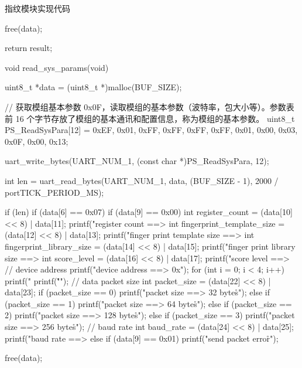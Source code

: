 \documentclass[lang=cn,newtx,10pt,scheme=chinese]{elegantbook}
\begin{document}
\begin{mycode}{指纹模块实现代码}
{    free(data);

    return result;
}

void read_sys_params(void)
{
    uint8_t *data = (uint8_t *)malloc(BUF_SIZE);

    // 获取模组基本参数 0x0F，读取模组的基本参数（波特率，包大小等）。参数表前 16 个字节存放了模组的基本通讯和配置信息，称为模组的基本参数。
    uint8_t PS_ReadSysPara[12] = {0xEF, 0x01, 0xFF, 0xFF, 0xFF, 0xFF, 0x01, 0x00, 0x03, 0x0F, 0x00, 0x13};

    uart_write_bytes(UART_NUM_1, (const char *)PS_ReadSysPara, 12);

    int len = uart_read_bytes(UART_NUM_1, data, (BUF_SIZE - 1), 2000 / portTICK_PERIOD_MS);

    if (len)
    {
        if (data[6] == 0x07)
        {
            if (data[9] == 0x00)
            {
                int register_count = (data[10] << 8) | data[11];
                printf("register count ==> %
                int fingerprint_template_size = (data[12] << 8) | data[13];
                printf("finger print template size ==> %
                int fingerprint_library_size = (data[14] << 8) | data[15];
                printf("finger print library size ==> %
                int score_level = (data[16] << 8) | data[17];
                printf("score level ==> %
                // device address
                printf("device address ==> 0x");
                for (int i = 0; i < 4; i++)
                {
                    printf("%
                }
                printf("\r\n");
                // data packet size
                int packet_size = (data[22] << 8) | data[23];
                if (packet_size == 0)
                {
                    printf("packet size ==> 32 bytes\r\n");
                }
                else if (packet_size == 1)
                {
                    printf("packet size ==> 64 bytes\r\n");
                }
                else if (packet_size == 2)
                {
                    printf("packet size ==> 128 bytes\r\n");
                }
                else if (packet_size == 3)
                {
                    printf("packet size ==> 256 bytes\r\n");
                }
                // baud rate
                int baud_rate = (data[24] << 8) | data[25];
                printf("baud rate ==> %
            }
            else if (data[9] == 0x01)
            {
                printf("send packet error\r\n");
            }
        }
    }

    free(data);
}
\end{mycode}
\end{document}
